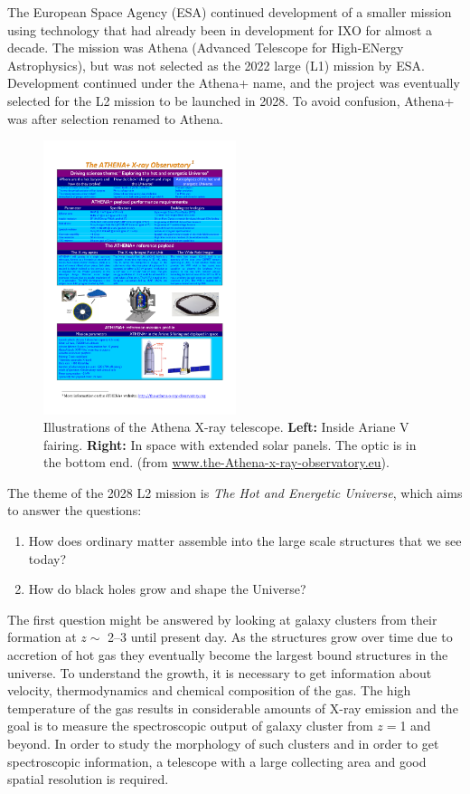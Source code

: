 The European Space Agency (ESA) continued development of a smaller mission using technology that had already been in development for IXO for almost a decade. The mission was Athena (Advanced Telescope for High-ENergy Astrophysics)\cite{Barcons:2012va}, but was not selected as the 2022 large (L1) mission by ESA. Development continued under the Athena+ name, and the project was eventually selected for the L2 mission to be launched in 2028. To avoid confusion, Athena+ was after selection renamed to Athena.

\begin{figure}[!h]
  \center
  \includegraphics[height=8cm]{figures/athena/athena_telescope.pdf}
\caption{\footnotesize Illustrations of the Athena X-ray telescope. \textbf{Left:} Inside Ariane V fairing. \textbf{Right:} In space with extended solar panels. The optic is in the bottom end. (from \url{www.the-Athena-x-ray-observatory.eu}).}\label{fig:Athena_telescope}
\end{figure}

The theme of the 2028 L2 mission is \emph{The Hot and Energetic Universe}, which aims to answer the questions:

\begin{enumerate}
  \item How does ordinary matter assemble into the large scale structures that we see today?
  \item How do black holes grow and shape the Universe?
\end{enumerate}

The first question might be answered by looking at galaxy clusters from their formation at $z\sim$ 2--3 until present day. As the structures grow over time due to accretion of hot gas they eventually become the largest bound structures in the universe. To understand the growth, it is necessary to get information about velocity, thermodynamics and chemical composition of the gas. The high temperature of the gas results in considerable amounts of X-ray emission and the goal is to measure the spectroscopic output of galaxy cluster from $z=$1 and beyond. In order to study the morphology of such clusters and in order to get spectroscopic information, a telescope with a large collecting area and good spatial resolution is required.

